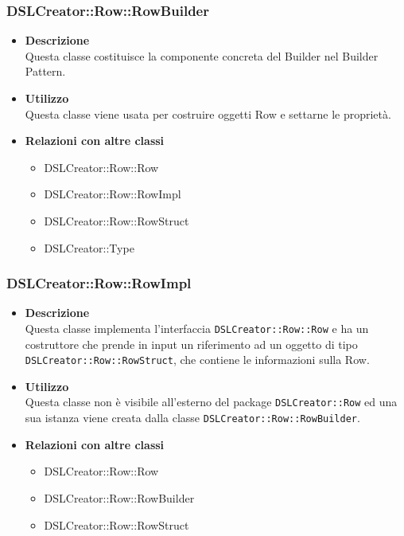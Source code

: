  \subsubsection{DSLCreator::Row::RowBuilder}
                    \begin{itemize}
                        \item \textbf{Descrizione} \hfill \\
                          Questa classe costituisce la componente concreta del Builder nel Builder Pattern.
                        \item \textbf{Utilizzo} \hfill \\
                          Questa classe viene usata per costruire oggetti Row e settarne le proprietà.
                        \item \textbf{Relazioni con altre classi}
                            \begin{itemize}
                              \item DSLCreator::Row::Row
                              \item DSLCreator::Row::RowImpl
                              \item DSLCreator::Row::RowStruct
                              \item DSLCreator::Type
                            \end{itemize}
                    \end{itemize}  

 \subsubsection{DSLCreator::Row::RowImpl}
                    \begin{itemize}
                        \item \textbf{Descrizione} \hfill \\
                          Questa classe implementa l'interfaccia \texttt{DSLCreator::Row::Row} e ha un costruttore che prende in input un riferimento ad un oggetto di tipo \texttt{DSLCreator::Row::RowStruct}, che contiene le informazioni sulla Row.
                        \item \textbf{Utilizzo} \hfill \\
                          Questa classe non è visibile all'esterno del package \texttt{DSLCreator::Row} ed una sua istanza viene creata dalla classe \texttt{DSLCreator::Row::RowBuilder}.
                        \item \textbf{Relazioni con altre classi}
                            \begin{itemize}
                              \item DSLCreator::Row::Row
                              \item DSLCreator::Row::RowBuilder
                              \item DSLCreator::Row::RowStruct
                            \end{itemize}
                    \end{itemize}  

